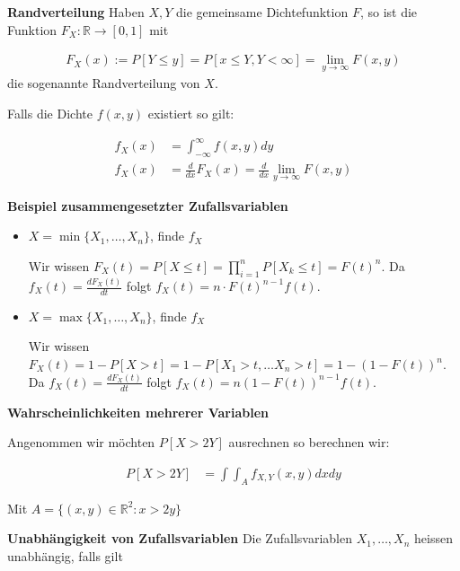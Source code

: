 \documentclass[25pt]{sciposter}
\newcommand{\R}{\mathbb{R}}
\newenvironment{method}[1]{\begin{mdframed}[backgroundcolor=blue!10,innertopmargin=15pt, innerbottommargin=15pt,nobreak=true]
		\textbf{#1 }
	}
	{ 
	\end{mdframed}
}
\newenvironment{thm}[1]{\begin{mdframed}[backgroundcolor=pink!20,innertopmargin=15pt, innerbottommargin=15pt, nobreak=true]
		\textbf{#1 }
	}
	{ 
	\end{mdframed}
}
\begin{document}
\begin{multicols}{3}
		\begin{method}{Randverteilung} Haben $X,Y$ die gemeinsame Dichtefunktion $F$, so ist die Funktion $F_X : \R \to [0,1]$ mit 
			
			\begin{align*}
				F_X(x) := P[Y \leq y] = P[x\leq Y, Y < \infty] = \lim_{y \to \infty} F(x,y)
			\end{align*}
			die sogenannte Randverteilung von $X$.
			
			Falls die Dichte $f(x,y)$ existiert so gilt:
			
			\begin{align*}
				f_X(x) &= \int_{-\infty}^{\infty}f(x,y) dy\\
				f_X(x) &= \frac{d}{dx}F_X(x) = \frac{d}{dx}\lim_{y \to \infty} F(x,y)
			\end{align*}
			
		\end{method}
		
		\textbf{Beispiel zusammengesetzter Zufallsvariablen}
		
		\begin{itemize}
			\item $X = \min\{X_1,\ldots,X_n\}$, finde $f_X$
			
			Wir wissen $F_X(t) = P[X\leq t] = \prod_{i=1}^n P[X_k \leq t] = F(t)^n$. Da $f_X(t) = \frac{dF_X(t)}{dt}$ folgt $f_X(t) = n\cdot F(t)^{n-1} f(t)$.
			
			\item $X = \max\{X_1,\ldots,X_n\}$, finde $f_X$
			
			Wir wissen $F_X(t) = 1 - P[X>t] = 1 - P [X_1 > t, \ldots X_n > t] = 1 - (1 - F(t))^n$. Da $f_X(t) = \frac{dF_X(t)}{dt}$ folgt $f_X(t) = n(1-F(t))^{n-1}f(t)$.
		\end{itemize}
		
		
		\begin{thm}{Wahrscheinlichkeiten mehrerer Variablen}
			Angenommen wir möchten $P[X > 2Y]$ ausrechnen so berechnen wir:
			
			\begin{align*}
				P[X>2Y] &= \int \int_A f_{X,Y} (x,y) dx dy
			\end{align*}
			
			Mit $A = \{(x,y)\in\R^2 : x > 2y\}$
		\end{thm}
		
		
		
		\begin{method}{Unabhängigkeit von Zufallsvariablen} Die Zufallsvariablen $X_1,\ldots, X_n$ heissen unabhängig, falls gilt
			

\end{method}
\end{multicols}
\end{document}
